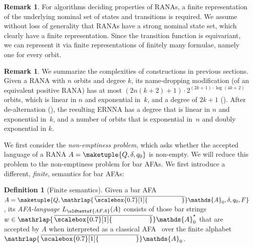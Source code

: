 \documentclass[10pt,a4paper]{amsart}
\theoremstyle{definition}
\newtheorem{defn}[theo]{Definition}
\newtheorem{rem}[theo]{Remark}
\renewcommand{\textsf}[1]{{\oldtextsf{\small#1}}}
\newcommand{\At}{\mathds{A}}
\newcommand{\barAs}{\barNames^{\star}}
\newcommand{\names}{\At}
\newcommand{\mybar}[3]{%
  \mathrlap{\hspace{#2}\overline{\scalebox{#1}[1]{\phantom{\ensuremath{#3}}}}}\ensuremath{#3}
}
\newcommand{\barNames}{{\mybar{0.7}{1.25pt}{\names}}}
\begin{document}
\begin{rem}
  For algorithms deciding properties of RANAs, a finite representation
  of the underlying nominal set of states and transitions is
  required.
  We assume without loss of generality that RANAs have a strong nominal
  state set, which clearly have a finite representation. Since the transition
  function is equivariant, we can represent it via finite representations of
  finitely many formulae, namely one for every orbit.
\end{rem}

\begin{rem} \label{rem:compConstr}
  We summarize the complexities of constructions in previous sections.
  Given a RANA with $n$ orbits and degree $k$, its name-dropping modification (of an equivalent positive RANA) has at most $(2n(k + 2)+1) \cdot 2^{(2k + 1) \cdot \log(4k + 2)}$ orbits, which is linear in $n$ and exponential in~$k$, and a degree of $2k + 1$ ().
  After de-alternation (), the resulting ERNNA has a degree that is linear in $n$ and exponential in~$k$, and  a number of orbits that is exponential in~$n$ and doubly exponential in $k$.
\end{rem}

We first consider the \emph{non-emptiness problem}, which asks whether the accepted language of a RANA $A = \maketuple{Q, \delta, q_0}$ is non-empty. We will reduce this problem to the non-emptiness problem for bar AFAs. We first introduce a different, \emph{finite}, semantics for bar AFAs:

\begin{defn}[Finite semantics]
  Given a bar AFA $A = \maketuple{Q, \barNames_0, \delta, q_0, F}$, its \emph{AFA-language}
  $L_{\textsf{\scriptsize AFA}}(A)$ consists of those bar strings $w \in \barAs_0$ that are accepted by $A$ when
  interpreted as a classical AFA~\cite{cks81} over the finite alphabet $\barNames_0$.
\end{defn}
\end{document}
